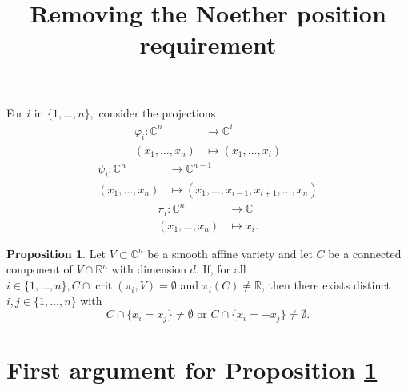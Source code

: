\documentclass[11pt]{article}
\title{Removing the Noether position requirement}
\author{}
\date{}
\theoremstyle{definition}
\newtheorem{proposition}{Proposition}
\newcommand{\C}{\mathbb{C}}
\newcommand{\R}{\mathbb{R}}
\newcommand{\vp}{\varphi}
\DeclareMathOperator{\crit}{crit}
\begin{document}
\maketitle

For $i$ in
$\{1,\dots,n\},$ consider the projections
\begin{align*}
    \vp_i: \C^n  &\rightarrow \C^i \\
    (x_1,\hdots,x_n) &\mapsto  (x_1,\hdots,x_i)    
\end{align*}
\begin{align*}
    \psi_i: \C^n  &\rightarrow \C^{n-1} \\
    (x_1,\hdots,x_n) &\mapsto  (x_1,\hdots,x_{i-1},x_{i+1},\hdots,x_n)    
\end{align*}
\begin{align*}
    \pi_i: \C^n  &\rightarrow \C \\
    (x_1,\hdots,x_n) &\mapsto x_i.
\end{align*}




\begin{proposition}\label{prop:main}
    Let $V \subset \C^n$ be a smooth affine variety and let $C$ be a connected component of $V \cap \R^n$ with dimension $d$. If, for all $i \in \{1,\hdots,n\}, C \cap \crit(\pi_i,V) = \emptyset$  and  $\pi_i(C) \not = \R$, then there exists distinct $i,j \in\{1,\hdots,n\}$ with
    \[
C \cap \{ x_i= x_j\} \not = \emptyset \textrm{ or }
C \cap \{ x_i= -x_j\} \not = \emptyset. 
    \]
\end{proposition}




\section*{First argument for Proposition \ref{prop:main}}
\end{document}
